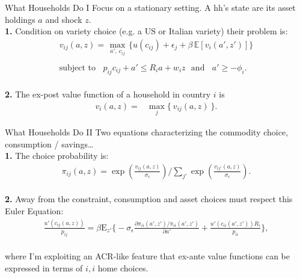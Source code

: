 \documentclass[9pt,pdftex,aspectratio=1610]{beamer}
\theoremstyle{definition}
\begin{document}

\begin{frame}[t]{What Households Do I}
\smallskip
Focus on a stationary setting. A hh's state are its asset holdings $a$ and shock $z$.\\
\bigskip
\textbf{1.} Condition on variety choice (e.g. a US or Italian variety) their problem is:
\begin{align}
v_{ij}(a, z) =   \max_{\ a', \ c_{ij}  \ }\bigg  \{ u(c_{ij}) + \epsilon_{j}  + \beta \, \mathbb{E} [v_{i}(a', z')]  \bigg\} \nonumber \\
\nonumber \\
\mbox{subject to}  \ \ \  \  p_{ij}c_{ij} +  a' \leq    R_{i} a + w_{i} z \ \ \  \mbox{and} \ \ \ \ a' \geq - \phi_{i}. \nonumber
\end{align}\\
\bigskip
\medskip
\textbf{2.} The ex-post value function of a household in country $i$ is
\begin{align}
v_{i}(a, z) = &  \max_{j} \big  \{ \  v_{ij}(a, z)  \ \big \}. \nonumber
\end{align}
\end{frame}


\begin{frame}[t]{What Households Do II}
\smallskip
Two equations characterizing the commodity choice, consumption / savings\ldots\\
\bigskip
\textbf{1.} The choice probability is:
\begin{align*}
\pi_{ij}(a, z) = \exp \left( \frac{ v_{ij}(a, z) }{\sigma_{\epsilon}} \right) \Bigg / \sum_{j'} \exp \left( \frac{ v_{ij'}(a, z) }{\sigma_{\epsilon}} \right).
\end{align*}
\\
\bigskip
\medskip
\textbf{2.} Away from the constraint, consumption and asset choices must respect this Euler Equation:
\begin{align*}
\frac{u'(c_{ij}(a,z))}{p_{ij}} = \beta \mathrm{E}_{z'} \bigg \{ -\sigma_{\epsilon} \frac{\partial \pi_{ii}(a',z') / \pi_{ii}(a',z')}{\partial a'} + \frac{u'(c_{ii}(a',z'))R_i}{p_{ii}} \bigg \},
\end{align*}\\
\smallskip
where I'm exploiting an ACR-like feature that ex-ante value functions can be expressed in terms of $i,i$ home choices.
\end{frame}
\end{document}
